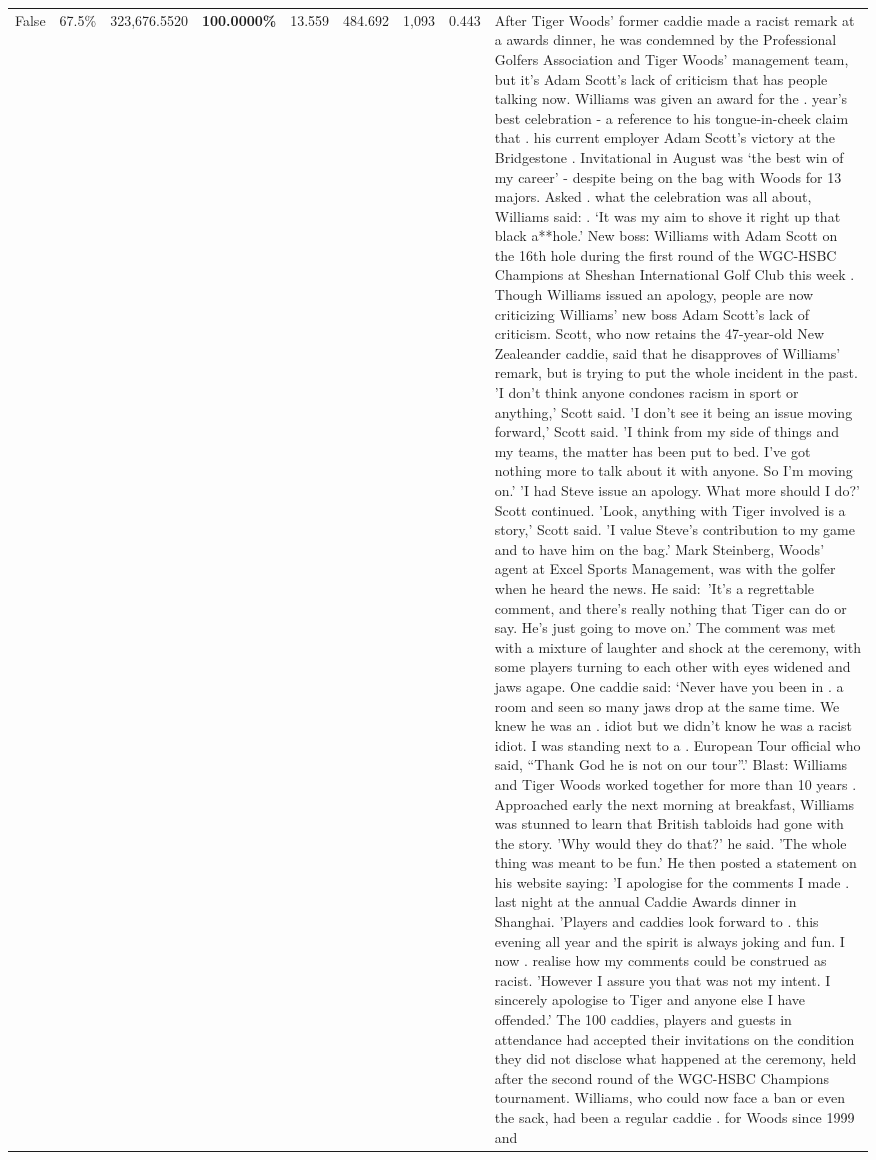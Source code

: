 \begin{table}[H]
\begin{tabular}{lllrlllll}
False & 67.5\% & 323,676.5520 & \bfseries \color{red} 100.0000\% & 13.559 & 484.692 & 1,093 & 0.443 & After Tiger Woods' former caddie made a racist remark at a awards dinner, he was condemned by the Professional Golfers Association and Tiger Woods' management team, but it's Adam Scott's lack of criticism that has people talking now. Williams was given an award for the . year’s best celebration - a reference to his tongue-in-cheek claim that . his current employer Adam Scott’s victory at the Bridgestone . Invitational in August was ‘the best win of my career’ - despite being on the bag with Woods for 13 majors. Asked . what the celebration was all about, Williams said: . ‘It was my aim to shove it right up that black a**hole.’ New boss: Williams with Adam Scott  on the 16th hole during the first round of the WGC-HSBC Champions at Sheshan International Golf Club this week . Though Williams issued an apology, people are now criticizing Williams' new boss Adam Scott's lack of criticism. Scott, who now retains the 47-year-old New Zealeander caddie, said that he disapproves of Williams' remark, but is trying to put the whole incident in the past. 'I don't think anyone condones racism in sport or anything,' Scott said. 'I don't see it being an issue moving forward,' Scott said. 'I think from my side of things and my teams, the matter has been put to bed. I've got nothing more to talk about it with anyone. So I'm moving on.' 'I had Steve issue an apology. What more should I do?' Scott continued. 'Look, anything with Tiger involved is a story,' Scott said. 'I value Steve's contribution to my game and to have him on the bag.' Mark Steinberg, Woods' agent at Excel Sports Management, was with the golfer when he heard the news. He said: 'It's a regrettable comment, and there's really nothing that Tiger can do or say. He's just going to move on.' The comment was met with a mixture of laughter and shock at the ceremony, with some players turning to each other with eyes widened and jaws agape. One caddie said: ‘Never have you been in . a room and seen so many jaws drop at the same time. We knew he was an . idiot but we didn’t know he was a racist idiot. I was standing next to a . European Tour official who said, “Thank God he is not on our tour”.’ Blast: Williams and Tiger Woods worked together for more than 10 years . Approached early the next morning at breakfast, Williams was stunned to learn that British tabloids had gone with the story. 'Why would they do that?' he said. 'The whole thing was meant to be fun.' He then posted a statement on his website saying: 'I apologise for the comments I made . last night at the annual Caddie Awards dinner in Shanghai. 'Players and caddies look forward to . this evening all year and the spirit is always joking and fun. I now . realise how my comments could be construed as racist. 'However I assure you that was not my intent. I sincerely apologise to Tiger and anyone else I have offended.' The 100 caddies, players and guests in attendance had accepted their invitations on the condition they did not disclose what happened at the ceremony, held after the second round of the WGC-HSBC Champions tournament. Williams, who could now face a ban or even the sack, had been a regular caddie . for Woods since 1999 and 
\end{tabular}
\end{table}
